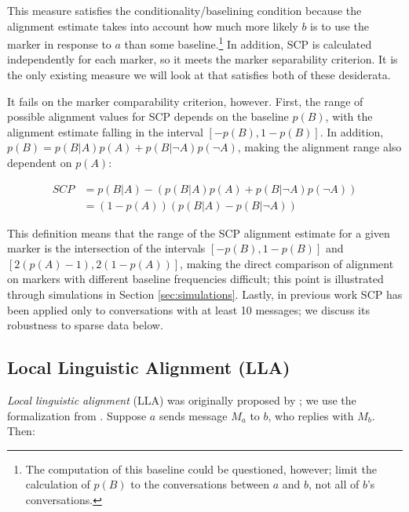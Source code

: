 \documentclass{acm_proc_article-sp}
\begin{document}
This measure satisfies the conditionality/baselining condition because the alignment estimate takes into account how much more likely $b$ is to use the marker in response to $a$ than some baseline.\footnote{The computation of this baseline could be questioned, however; \cite{DNMGamonDumais2011} limit the calculation of $p(B)$ to the conversations between $a$ and $b$, not all of $b$'s conversations.}  In addition, SCP is calculated independently for each marker, so it meets the marker separability criterion.  It is the only existing measure we will look at that satisfies both of these desiderata.

It fails on the marker comparability criterion, however.  First, the range of possible alignment values for SCP depends on the baseline $p(B)$, with the alignment estimate falling in the interval $[-p(B),1-p(B)]$.  In addition, $p(B) = p(B|A)p(A) + p(B|\neg A)p(\neg A)$, making the alignment range also dependent on $p(A)$:

\begin{align*}
SCP & =  p(B|A) - (p(B|A)p(A) + p(B|\neg A)p(\neg A)) \\
& = (1-p(A))(p(B|A) - p(B|\neg A))
\end{align*} 

This definition means that the range of the SCP alignment estimate for a given marker is the intersection of the intervals $[-p(B), 1-p(B)]$ and $[2(p(A)-1), 2(1-p(A))]$, making the direct comparison of alignment on markers with different baseline frequencies difficult; this point is illustrated through simulations in Section \ref{sec:simulations}.  Lastly, in previous work SCP has been applied only to conversations with at least 10 messages; we discuss its robustness to sparse data below.

\subsection{Local Linguistic Alignment (LLA)} 

\textit{Local linguistic alignment} (LLA) was originally proposed by \cite{FusaroliEtAl2012}; we use the formalization from \cite{WangReitterYen2014}.  Suppose $a$ sends message $M_a$ to $b$, who replies with $M_b$. Then:
\end{document}
